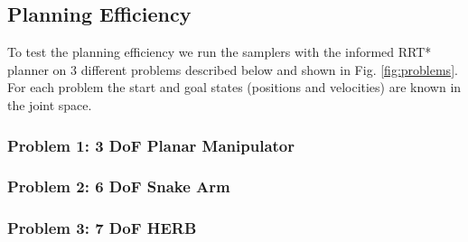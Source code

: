 \documentclass[letterpaper, 10 pt, conference]{ieeeconf}  %
\begin{document}
\subsection{Planning Efficiency}

To test the planning efficiency we run the samplers with the informed RRT* planner on 3 different problems described below and shown in Fig. \ref{fig:problems}. For each problem the start and goal states (positions and velocities) are known in the joint space.

\subsubsection{Problem 1: 3 DoF Planar Manipulator}

\subsubsection{Problem 2: 6 DoF Snake Arm}

\subsubsection{Problem 3: 7 DoF HERB}
\end{document}
